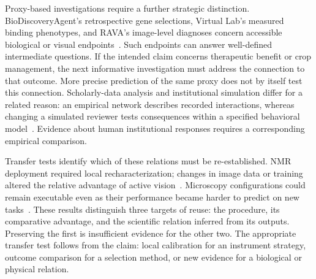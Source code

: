Proxy-based investigations require a further strategic distinction. BioDiscoveryAgent's retrospective gene selections, Virtual Lab's measured binding phenotypes, and RAVA's image-level diagnoses concern accessible biological or visual endpoints~\cite{asd0020,asd0054,asd1133}. Such endpoints can answer well-defined intermediate questions. If the intended claim concerns therapeutic benefit or crop management, the next informative investigation must address the connection to that outcome. More precise prediction of the same proxy does not by itself test this connection. Scholarly-data analysis and institutional simulation differ for a related reason: an empirical network describes recorded interactions, whereas changing a simulated reviewer tests consequences within a specified behavioral model~\cite{asd0624,asd0786}. Evidence about human institutional responses requires a corresponding empirical comparison.

Transfer tests identify which of these relations must be re-established. NMR deployment required local recharacterization; changes in image data or training altered the relative advantage of active vision~\cite{asd1064,asd1133}. Microscopy configurations could remain executable even as their performance became harder to predict on new tasks~\cite{asd1009}. These results distinguish three targets of reuse: the procedure, its comparative advantage, and the scientific relation inferred from its outputs. Preserving the first is insufficient evidence for the other two. The appropriate transfer test follows from the claim: local calibration for an instrument strategy, outcome comparison for a selection method, or new evidence for a biological or physical relation.




